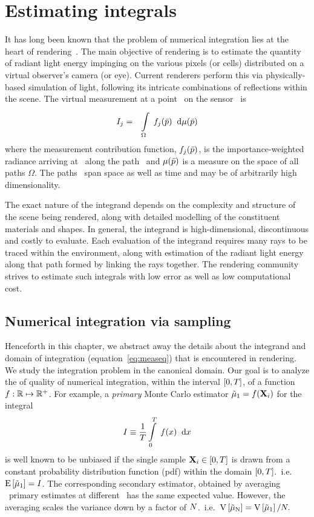 \documentclass[11pt,fleqn]{book} %
\begin{document}
\chapter{Estimating integrals}
It has long been known that the problem of numerical integration lies at the heart of rendering~\cite{Perlin89Course}. The main objective of rendering is to estimate the quantity of radiant light energy impinging on the various pixels (or cells) distributed on a virtual observer's camera (or eye). Current renderers perform this via physically-based simulation of light, following its intricate combinations of reflections within the scene. The virtual measurement \Ij {\xs} at a point \xs\  on the sensor~\cite[ch.8]{Veach:1998:RMC:927297} is
\begin{eqnarray} \label{eq:measeq}
 I_{j} & = & \displaystyle\int\limits_{\Omega}^{} \; f_{j}(\bar{p}) \;\; \mathrm{d}\mu(\bar{p})
\end{eqnarray}
where the measurement contribution function, $f_{j}(\bar{p})$, is the importance-weighted radiance arriving at \xs\ along the path \pth\ and $\mu(\bar{p})$ is a measure on the space of all paths $\Omega$. The paths \pth\ span space as well as time and may be of arbitrarily high dimensionality. 

The exact nature of the integrand depends on the complexity and structure of the scene being rendered, along with detailed modelling of the constituent materials and shapes.  In general, the integrand is high-dimensional, discontinuous and costly to evaluate. Each evaluation of the integrand requires many rays to be traced within the environment, along with estimation of the radiant light energy along that path formed by linking the rays together. 
The rendering community strives to estimate such integrals with low error as well as low computational cost.


\section{Numerical integration via sampling}
Henceforth in this chapter, we abstract away the details about the integrand and domain of integration (equation~\ref{eq:measeq}) that is encountered in rendering. We study the integration problem in the canonical domain.  
Our goal is to analyze the of quality of numerical integration, within the interval $[0,T]$, of a function $f: \mathbb{R} \mapsto \mathbb{R}^{+}$. 
For example, a \textit{primary} Monte Carlo estimator $\tilde\mu_\mathrm{1} = f(\mathbf{X} _i)$ for the integral
\begin{equation} \label{eq:integcanonical}
I \equiv \frac 1 {T} \displaystyle\int\limits_{0}^{T} \; f(x)  \;\; \mathrm{d}x  
\end{equation}
is well known to be unbiased if the  single sample $\mathbf{X} _i \in [0,T] $ is drawn from a constant probability distribution function (pdf) within the domain $[0,T]$.~i.e.~$\mathrm{E} \left[\tilde\mu_\mathrm{1} \right] = I$.
The corresponding secondary estimator, obtained by averaging \N\ primary estimates at different \xii\ has the same expected value. However, the averaging scales the variance down by a factor of $N$.~i.e.~$\mathrm{V} \left[\tilde\mu_\mathrm{N}\right] = \mathrm{V} \left[\tilde\mu_\mathrm{1}\right]/N.$ 
\end{document}
